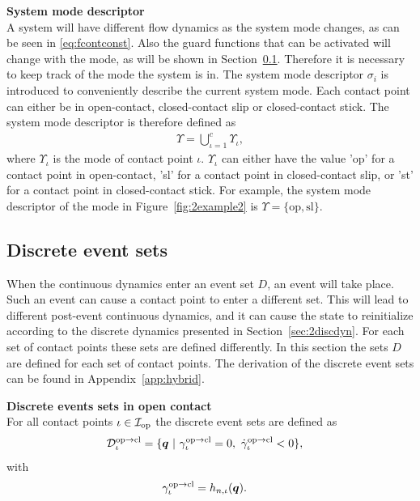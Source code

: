 \documentclass[../DC2017114Bouma.tex]{subfiles}
\begin{document}
\textbf{System mode descriptor}\\
A system will have different flow dynamics as the system mode changes, as can be seen in \eqref{eq:fcontconst}. Also the guard functions that can be activated will change with the mode, as will be shown in Section~\ref{sec:2event}. Therefore it is necessary to keep track of the mode the system is in. The system mode descriptor $\sigma_i$ is introduced to conveniently describe the current system mode. Each contact point can either be in open-contact, closed-contact slip or closed-contact stick. The system mode descriptor is therefore defined as
\begin{align}
\Upsilon = \bigcup_{\iota = 1}^c\Upsilon_\iota,
\end{align}
where $\Upsilon_\iota$ is the mode of contact point $\iota$. $\Upsilon_\iota$ can either have the value 'op' for a contact point in open-contact, 'sl' for a contact point in closed-contact slip, or 'st' for a contact point in closed-contact stick. For example, the system mode descriptor of the mode in Figure~\ref{fig:2example2} is $\Upsilon = \{\text{op},\text{sl}\}$.

\subsection{Discrete event sets}\label{sec:2event}
When the continuous dynamics enter an event set $D$, an event will take place. Such an event can cause a contact point to enter a different set. This will lead to different post-event continuous dynamics, and it can cause the state to reinitialize according to the discrete dynamics presented in Section~\ref{sec:2discdyn}. For each set of contact points these sets are defined differently. In this section the sets $D$ are defined for each set of contact points. The derivation of the discrete event sets can be found in Appendix~\ref{app:hybrid}.

\textbf{Discrete events sets in open contact}\\
For all contact points $\iota\in\mathcal{I}_{\text{op}}$ the discrete event sets are defined as
\begin{align}
\mathcal{D}^{\text{op}\rightarrow\text{cl}}_{\iota} &= \{ \qb\ |\ \gamma^{\text{op}\rightarrow\text{cl}}_{\iota} = 0,\ \dot{\gamma}^{\text{op}\rightarrow\text{cl}}_{\iota} < 0 \},\label{eq:2Dopcl}
\end{align}
%
with
\begin{align}
\gamma^{\text{op}\rightarrow\text{cl}}_{\iota} &= h_{n,\iota}({\boldsymbol{q}}).
\end{align}
\end{document}
